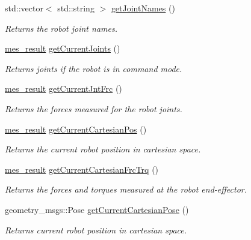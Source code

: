 \begin{DoxyCompactItemize}
\item 
std\+::vector$<$ std\+::string $>$ \hyperlink{classkukadu_1_1PlottingControlQueue_aaf706cd0d7c11787dff3e95a422f38c5}{get\+Joint\+Names} ()
\begin{DoxyCompactList}\small\item\em Returns the robot joint names. \end{DoxyCompactList}\item 
\hyperlink{structmes__result}{mes\+\_\+result} \hyperlink{classkukadu_1_1PlottingControlQueue_ab0cb15c4ab4759bb313ea935149870cf}{get\+Current\+Joints} ()
\begin{DoxyCompactList}\small\item\em Returns joints if the robot is in command mode. \end{DoxyCompactList}\item 
\hyperlink{structmes__result}{mes\+\_\+result} \hyperlink{classkukadu_1_1PlottingControlQueue_a6934e9ae7b6824b0fc01308dccdfd0e8}{get\+Current\+Jnt\+Frc} ()
\begin{DoxyCompactList}\small\item\em Returns the forces measured for the robot joints. \end{DoxyCompactList}\item 
\hyperlink{structmes__result}{mes\+\_\+result} \hyperlink{classkukadu_1_1PlottingControlQueue_a876ce6f03b1ab92384e282a55fd83cf0}{get\+Current\+Cartesian\+Pos} ()
\begin{DoxyCompactList}\small\item\em Returns the current robot position in cartesian space. \end{DoxyCompactList}\item 
\hyperlink{structmes__result}{mes\+\_\+result} \hyperlink{classkukadu_1_1PlottingControlQueue_a86ac37d03a159b54981d40d25486ca26}{get\+Current\+Cartesian\+Frc\+Trq} ()
\begin{DoxyCompactList}\small\item\em Returns the forces and torques measured at the robot end-\/effector. \end{DoxyCompactList}\item 
geometry\+\_\+msgs\+::\+Pose \hyperlink{classkukadu_1_1PlottingControlQueue_ac7f7c811fab06667e75a4da5c8364cc8}{get\+Current\+Cartesian\+Pose} ()
\begin{DoxyCompactList}\small\item\em Returns current robot position in cartesian space. \end{DoxyCompactList}\item 

\end{DoxyCompactItemize}
